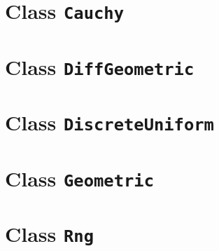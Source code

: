 \documentclass{report}
\begin{document}
\chapter{Class {\tt Cauchy}}



\clearpage
\chapter{Class {\tt DiffGeometric}}



\clearpage
\chapter{Class {\tt DiscreteUniform}}



%


\clearpage
\chapter{Class {\tt Geometric}}



\clearpage
\chapter{Class {\tt Rng}}



%
\end{document}
